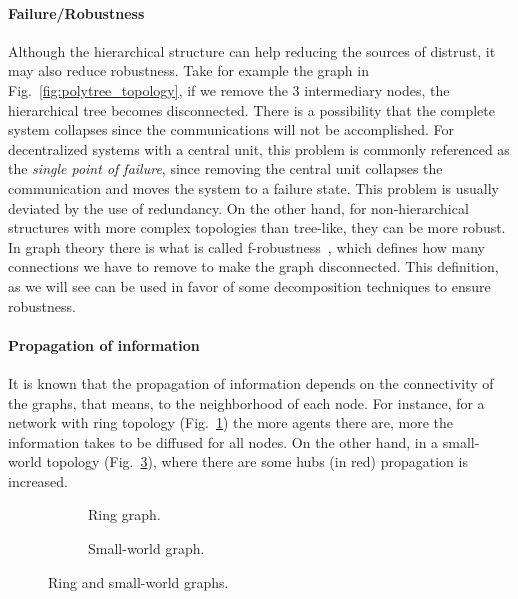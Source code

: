 \documentclass[../main.tex]{subfiles}
\begin{document}
\paragraph{Failure/Robustness}
Although the hierarchical structure can help reducing the sources of distrust, it may also reduce robustness.
Take for example the graph in Fig.~\ref{fig:polytree_topology}, if we remove the $3$ intermediary nodes, the hierarchical tree becomes disconnected.
There is a possibility that the complete system collapses since the communications will not be accomplished.
For decentralized systems with a central unit, this problem is commonly referenced as the \emph{single point of failure}, since removing the central unit collapses the communication and moves the system to a failure state.
This problem is usually deviated by the use of redundancy.
On the other hand, for non-hierarchical structures with more complex topologies than tree-like, they can be more robust.
In graph theory there is what is called f-robustness~\cite{DibajiIshii2015}, which defines how many connections we have to remove to make the graph disconnected.
This definition, as we will see can be used in favor of some decomposition techniques to ensure robustness.

\paragraph{Propagation of information}
It is known that the propagation of information depends on the connectivity of the graphs, that means, to the neighborhood of each node.
For instance, for a network with ring topology (Fig.~\ref{fig:ring_topology}) the more agents there are, more the information takes to be diffused for all nodes.
On the other hand, in a small-world topology (Fig.~\ref{fig:smallworld_topology}), where there are some hubs (in red) propagation is increased.

\begin{figure}[h]
  \begin{subfigure}[t]{.45\textwidth}
    \centering
    \caption{Ring graph.}\label{fig:ring_topology}
  \end{subfigure}
  \hfill
  \begin{subfigure}[t]{.45\textwidth}
    \centering
    \caption{Small-world graph.}\label{fig:smallworld_topology}
  \end{subfigure}
  \caption{Ring and small-world graphs.}
\end{figure}
\end{document}
